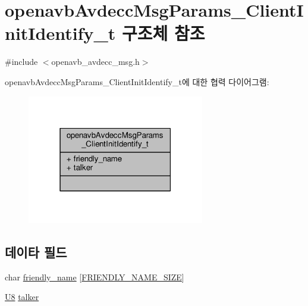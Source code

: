 \hypertarget{structopenavb_avdecc_msg_params___client_init_identify__t}{}\section{openavb\+Avdecc\+Msg\+Params\+\_\+\+Client\+Init\+Identify\+\_\+t 구조체 참조}
\label{structopenavb_avdecc_msg_params___client_init_identify__t}


{\ttfamily \#include $<$openavb\+\_\+avdecc\+\_\+msg.\+h$>$}



openavb\+Avdecc\+Msg\+Params\+\_\+\+Client\+Init\+Identify\+\_\+t에 대한 협력 다이어그램\+:
\nopagebreak
\begin{figure}[H]
\begin{center}
\leavevmode
\includegraphics[width=219pt]{structopenavb_avdecc_msg_params___client_init_identify__t__coll__graph}
\end{center}
\end{figure}
\subsection*{데이타 필드}
\begin{DoxyCompactItemize}
\item 
char \hyperlink{structopenavb_avdecc_msg_params___client_init_identify__t_a25c82ac188182d72242fb10f0285a2bd}{friendly\+\_\+name} \mbox{[}\hyperlink{tl_2openavb__tl__pub_8h_a29d83e67ee30c78c6ed81c188a433c10}{F\+R\+I\+E\+N\+D\+L\+Y\+\_\+\+N\+A\+M\+E\+\_\+\+S\+I\+ZE}\mbox{]}
\item 
\hyperlink{openavb__types__base__pub_8h_aa63ef7b996d5487ce35a5a66601f3e73}{U8} \hyperlink{structopenavb_avdecc_msg_params___client_init_identify__t_a9ce269c206dfe8d01ff1711003b5c1b8}{talker}
\end{DoxyCompactItemize}


